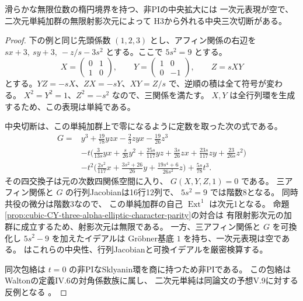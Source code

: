 \begin{proposition}\label{prop:cubic-CY-three-alpha-elliptic-two-dimensional-simple}
滑らかな無限位数の楕円境界を持つ、非PIの中央拡大には
一次元表現が空で、二次元単純加群の無限射影次元によって
H3から外れる中央三次切断がある。
\end{proposition}
\begin{proof}
下の例と同じ先頭係数 $(1,2,3)$ とし、アフィン関係の右辺を
$s x+3,\ s y+3,\ -z/s-3s^2$ とする。ここで $5s^2=9$ とする。
\[
 X=\begin{pmatrix}0&1\\1&0\end{pmatrix},\qquad
 Y=\begin{pmatrix}1&0\\0&-1\end{pmatrix},\qquad Z=sXY
\]
とする。$YZ=-sX$、$ZX=-sY$、$XY=Z/s$ で、逆順の積は全て符号が変わる。
$X^2=Y^2=1$、$Z^2=-s^2$ なので、三関係を満たす。
$X,Y$ は全行列環を生成するため、この表現は単純である。

中央切断は、この単純加群上で零になるように定数を取った次の式である。
\[
\begin{aligned}
 G={}&y^3+\tfrac{19}{78}yzx-\tfrac23zyx-\tfrac{19}{26}z^3\\
 &-t\bigl(\tfrac{3}{13s}yx+\tfrac{s}{26}y^2+\tfrac{25s}{117}yz
     +\tfrac{3s}{26}zx+\tfrac{23s}{117}zy+\tfrac{23}{26s}z^2\bigr)\\
 &-t^2\bigl(\tfrac{2s^2}{117}x+\tfrac{3s^2+26}{26}y
           +\tfrac{19s^4+6}{26s^2}z\bigr)+\tfrac{5s}{78}t^3 .
\end{aligned}
\]
その四交換子は元の次数四関係空間に入り、
$G(X,Y,Z,1)=0$ である。
三アフィン関係と $G$ の行列Jacobianは16行12列で、
$5s^2=9$ では階数8となる。
同時共役の微分は階数3なので、
この単純加群の自己 $\operatorname{Ext}^1$ は次元1となる。
命題\ref{prop:cubic-CY-three-alpha-elliptic-character-parity}の対合は
有限射影次元の加群に成立するため、射影次元は無限である。
一方、三アフィン関係と $G$ を可換化し $5s^2-9$ を加えたイデアルは
Gr\"obner基底 $1$ を持ち、一次元表現は空である。
はこれらの中央性、行列Jacobianと可換イデアルを厳密検算する。

同次包絡は $t=0$ の非PIなSklyanin環を商に持つため非PIである。
この包絡はWaltonの定義IV.6の対角係数族に属し、
二次元単純は同論文の予想V.9に対する反例となる
\cite[定理I.4、定義IV.6、予想V.9]{WaltonSklyaninThesis}。
\end{proof}

